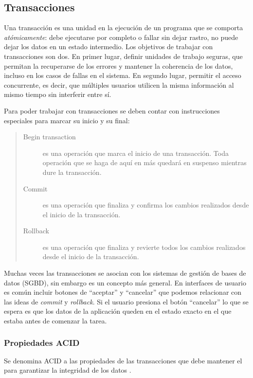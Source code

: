 \subsection{Transacciones}	

Una transacción es una unidad en la ejecución de un programa que se comporta 
\emph{atómicamente}: debe ejecutarse por completo o fallar sin dejar rastro, no
puede dejar los datos en un estado intermedio.
Los objetivos de trabajar con transacciones son dos.
En primer lugar, definir unidades de trabajo seguras, que permitan la
recuperarse de los errores y mantener la coherencia de los datos, incluso en
los casos de fallas en el sistema.
En segundo lugar, permitir el acceso concurrente, es decir, que múltiples
usuarios utilicen la misma información al mismo tiempo sin interferir entre sí.

Para poder trabajar con transacciones se deben contar con instrucciones
especiales para marcar su inicio y su final:
\begin{quote}
	\label{ctxTransactional}
	\begin{description}
		\item[Begin transaction] es una operación que marca el inicio de una
		transacción. Toda operación que se haga de aquí en más quedará en suspenso
		mientras dure la transacción.
	
		\item[Commit] es una operación que finaliza y confirma los
		cambios realizados desde el inicio de la transacción. 
		
		\item[Rollback] es una operación que finaliza y revierte todos los cambios
		realizados desde el inicio de la transacción.
	\end{description}
\end{quote}
   
\bigskip

Muchas veces las transacciones se asocian con los sistemas de gestión de bases
de datos (SGBD), sin embargo es un concepto más general.
En interfaces de usuario es común incluir botones de
``aceptar'' y ``cancelar'' que podemos relacionar con las ideas de
\emph{commit} y \emph{rollback}. 
Si el usuario presiona el botón ``cancelar'' lo que se espera
es que los datos de la aplicación queden en el estado exacto en el que estaba
antes de comenzar la tarea.

\bigskip

\subsubsection{Propiedades ACID}
\label{sec:ACID}
Se denomina ACID a las propiedades de las transacciones que debe mantener
el  para garantizar la
integridad de los datos \cite{HaerderReuter83}.

